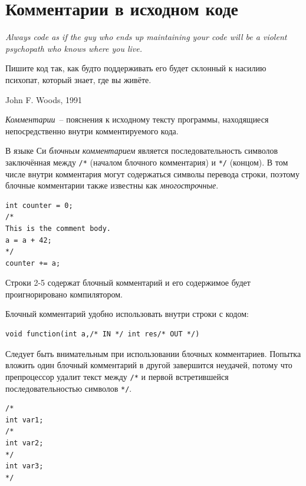 \documentclass[myc.tex]{subfiles}
\begin{document}
\section{Комментарии в исходном коде}
\epigraph{\textit{Always code as if the guy who ends up maintaining your code will be a violent psychopath who knows where you live.}

\vspace{6pt} %

Пишите код так, как будто поддерживать его будет склонный к насилию психопат, который знает, где вы живёте.}{John F. Woods, 1991}

\textit{Комментарии}~-- пояснения к исходному тексту программы, находящиеся непосредственно внутри комментируемого кода.


В языке Си \textit{блочным комментарием} является последовательность символов заключённая между \texttt{/*} (началом блочного комментария) и \texttt{*/} (концом). В том числе внутри комментария могут содержаться символы перевода строки, поэтому блочные комментарии также известны как \textit{многострочные}.

\begin{lstlisting}[title=Пример блочного комментария]
int counter = 0;
/*
This is the comment body.
a = a + 42;
*/
counter += a;
\end{lstlisting}

Строки 2-5 содержат блочный комментарий и его содержимое будет проигнорировано компилятором.

Блочный комментарий удобно использовать внутри строки с кодом:
\begin{lstlisting}
void function(int a,/* IN */ int res/* OUT */)
\end{lstlisting}

Следует быть внимательным при использовании блочных комментариев. Попытка вложить один блочный комментарий в другой завершится неудачей, потому что препроцессор удалит текст между \texttt{/*} и первой встретившейся последовательностью символов \texttt{*/}.

\begin{lstlisting}
/*
int var1;
/*
int var2;
*/
int var3;
*/
\end{lstlisting}
\end{document}
